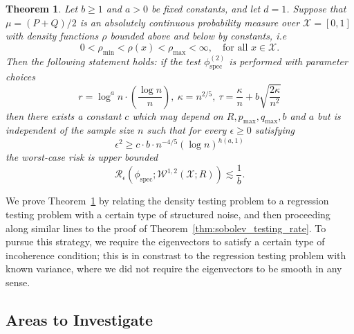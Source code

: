 \documentclass{article}
\newcommand{\1}{\mathbf{1}}
\newcommand{\spec}{\mathrm{spec}}
\theoremstyle{alden}
\theoremstyle{aldenthm}
\newtheorem{theorem}{Theorem}
\theoremstyle{definition}
\theoremstyle{remark}
\begin{document}
\begin{theorem}
	\label{thm:twosample_sobolev_testing_rate}
	Let $b \geq 1$ and $a > 0$ be fixed constants, and let $d = 1$.  Suppose that $\mu = (P + Q)/2$ is an absolutely continuous probability measure over $\mathcal{X} = [0,1]$ with density functions $\rho$ bounded above and below by constants, i.e
	\begin{equation*}
	0 < \rho_{\min} < \rho(x) < \rho_{\max} < \infty, \quad \textrm{for all $x \in \mathcal{X}$.}
	\end{equation*}
	Then the following statement holds: if the test $\phi_{\spec}^{(2)}$ is performed with parameter choices 
	\begin{equation*}
	r = \log^a n \cdot \left(\frac{\log n}{n}\right), ~\kappa = n^{2/5}, ~\tau = \frac{\kappa}{n} + b\sqrt{\frac{2\kappa}{n^2}}
	\end{equation*}
	then there exists a constant $c$ which may depend on $R,p_{\max},q_{\max},b$ and $a$ but is independent of the sample size $n$ such that for every $\epsilon \geq 0$ satisfying
	\begin{equation}
	\label{eqn:twosample_sobolev_testing_rate}
	\epsilon^2 \geq c \cdot b \cdot n^{-4/5} (\log n)^{h(a,1)}
	\end{equation}
	the worst-case risk is upper bounded
	\begin{equation}
	\label{eqn:twosample_sobolev_testing_rate_1}
	\mathcal{R}_{\epsilon}(\phi_{\mathrm{spec}}; \mathcal{W}^{1,2}(\mathcal{X};R)) \lesssim \frac{1}{b}.
	\end{equation}
\end{theorem}

We prove Theorem~\ref{thm:twosample_sobolev_testing_rate} by relating the density testing problem to a regression testing problem with a certain type of structured noise, and then proceeding along similar lines to the proof of Theorem~\ref{thm:sobolev_testing_rate}. To pursue this strategy, we require the eigenvectors to satisfy a certain type of incoherence condition; this is in constrast to the regression testing problem with known variance, where we did not require the eigenvectors to be smooth in any sense.

\subsection{Areas to Investigate}
\end{document}
